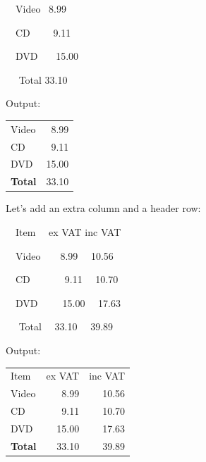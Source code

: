 \begin{code}
\newline
\strut~~Video~ 8.99\newline
\strut~~CD~~~~ 9.11\newline
\strut~~DVD~~~
15.00\newline
\strut~~ Total  33.10\newline
{}
\end{code}%
Output:\screenpagebreak
\begin{result}
\begin{tabular}{lr}
Video & 8.99\\
CD & 9.11\\
DVD & 15.00\\
\bfseries Total & 33.10
\end{tabular}
\end{result}%
Let's add an extra column and a header row:
\begin{code}\obeyspaces
{}\newline
\strut~~Item~~ ex VAT  inc
VAT\newline
\strut~~Video~~~~8.99 ~~10.56 \newline
\strut~~CD~~~~~~~9.11 ~~10.70 \newline
\strut~~DVD~~~~~15.00 ~~17.63 \newline
\strut~~ Total ~~33.10 ~~39.89\newline
{}
\end{code}%
Output:
\begin{result}
\begin{tabular}{lrr}
Item  & ex VAT & inc VAT\\ 
Video & 8.99 & 10.56\\
CD & 9.11 & 10.70\\
DVD & 15.00 & 17.63\\
\bfseries Total & 33.10 & 39.89
\end{tabular}
\end{result}%

